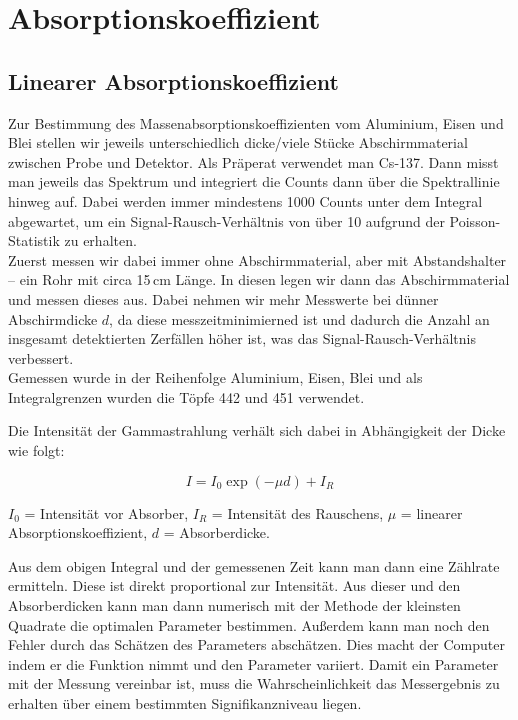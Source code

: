 \clearpage
\section{Absorptionskoeffizient}
\label{section:Absorbtionskoeff}

\subsection{Linearer Absorptionskoeffizient}

Zur Bestimmung des Massenabsorptionskoeffizienten vom Aluminium, Eisen und Blei stellen wir jeweils 
unterschiedlich dicke/viele Stücke Abschirmmaterial zwischen Probe und Detektor. Als Präperat verwendet man Cs-137. Dann misst man jeweils das Spektrum und 
integriert die Counts dann über die Spektrallinie hinweg auf. Dabei werden immer mindestens 1000 Counts unter dem Integral abgewartet, 
um ein Signal-Rausch-Verhältnis von über 10 aufgrund der Poisson-Statistik zu erhalten. \\
Zuerst messen wir dabei immer ohne Abschirmmaterial, aber mit Abstandshalter – ein Rohr mit circa 15\,cm Länge. In diesen legen wir dann das Abschirmmaterial und messen dieses aus. 
Dabei nehmen wir mehr Messwerte bei dünner Abschirmdicke $d$, da diese messzeitminimierned ist und dadurch die Anzahl an insgesamt detektierten Zerfällen höher ist, was das Signal-Rausch-Verhältnis verbessert. \\
Gemessen wurde in der Reihenfolge Aluminium, Eisen, Blei und als Integralgrenzen wurden die Töpfe 442 und 451 verwendet.

Die Intensität der Gammastrahlung verhält sich dabei in Abhängigkeit der Dicke wie folgt:

\begin{equation}
    I = I_0 \exp(- \mu d) +I_R
    \label{Intensitaet}
\end{equation}

$I_0$ = Intensität vor Absorber, $I_R$ = Intensität des Rauschens, $\mu$ = linearer Absorptionskoeffizient, $d$ = Absorberdicke. 

Aus dem obigen Integral und der gemessenen Zeit kann man dann eine Zählrate ermitteln. Diese ist direkt proportional zur Intensität. 
Aus dieser und den Absorberdicken kann man dann numerisch mit der Methode der kleinsten Quadrate die optimalen Parameter bestimmen. Außerdem kann man 
noch den Fehler durch das Schätzen des Parameters abschätzen. Dies macht der Computer indem er die Funktion nimmt 
und den Parameter variiert. Damit ein Parameter mit der Messung vereinbar ist, 
muss die Wahrscheinlichkeit das Messergebnis zu erhalten über einem bestimmten Signifikanzniveau liegen.\\

